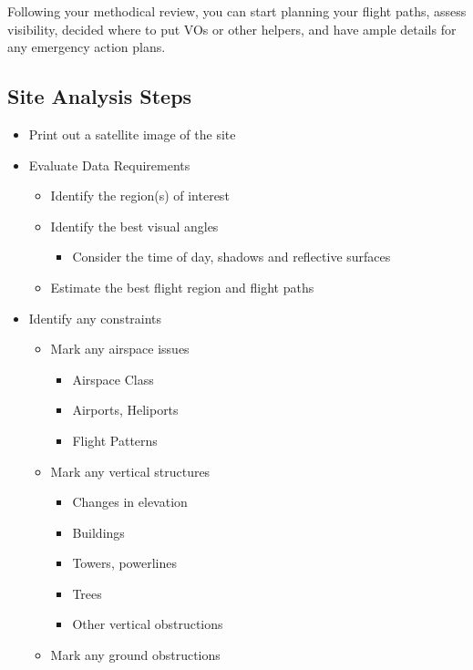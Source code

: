 \documentclass[
  12pt,
]{book}
\providecommand{\tightlist}{%
  \setlength{\itemsep}{0pt}\setlength{\parskip}{0pt}}
\begin{document}
Following your methodical review, you can start planning your flight paths, assess visibility, decided where to put VOs or other helpers, and have ample details for any emergency action plans.

\subsection{Site Analysis Steps}\label{site-analysis-steps}

\begin{itemize}
\tightlist
\item
  Print out a satellite image of the site
\item
  Evaluate Data Requirements

  \begin{itemize}
  \tightlist
  \item
    Identify the region(s) of interest
  \item
    Identify the best visual angles

    \begin{itemize}
    \tightlist
    \item
      Consider the time of day, shadows and reflective surfaces
    \end{itemize}
  \item
    Estimate the best flight region and flight paths
  \end{itemize}
\item
  Identify any constraints

  \begin{itemize}
  \tightlist
  \item
    Mark any airspace issues

    \begin{itemize}
    \tightlist
    \item
      Airspace Class
    \item
      Airports, Heliports
    \item
      Flight Patterns
    \end{itemize}
  \item
    Mark any vertical structures

    \begin{itemize}
    \tightlist
    \item
      Changes in elevation
    \item
      Buildings
    \item
      Towers, powerlines
    \item
      Trees
    \item
      Other vertical obstructions
    \end{itemize}
  \item
    Mark any ground obstructions


\end{itemize}
\end{itemize}
\end{document}
